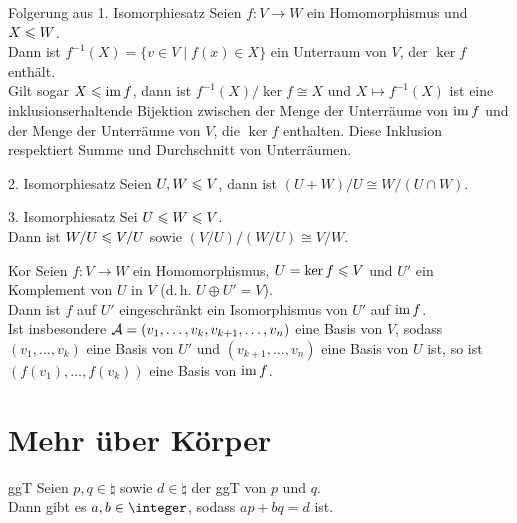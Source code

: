 \begin{Satz}{Folgerung aus 1. Isomorphiesatz}
    Seien $f: V \rightarrow W$ ein Homomorphismus und $X \leqslant W$. \\
    Dann ist $f^{-1}(X) = \{v \in V \;|\; f(x) \in X\}$ ein Unterraum von
    $V$, der $\ker f$ enthält. \\
    Gilt sogar $X \leqslant \operatorname{im} f$, dann ist $f^{-1}(X) / \ker f \cong X$ und
    $X \mapsto f^{-1}(X)$ ist eine inklusionserhaltende Bijektion zwischen
    der Menge der Unterräume von $\operatorname{im} f$ und der Menge der Unterräume von
    $V$, die $\ker f$ enthalten.
    Diese Inklusion respektiert Summe und Durchschnitt von Unterräumen.
\end{Satz}

\begin{Satz}{2. Isomorphiesatz}
    Seien $U, W \leqslant V$, dann ist
    $(U + W)/U \cong W/(U \cap W)$.
\end{Satz}

\begin{Satz}{3. Isomorphiesatz}
    Sei $U \leqslant W \leqslant V$. \\
    Dann ist $W/U \leqslant V/U$ sowie
    $(V/U)\big/(W/U) \cong V/W$.
\end{Satz}

\begin{Satz}{Kor}
    Seien $f: V \rightarrow W$ ein Homomorphismus, $U = \ker f \leqslant V$
    und $U'$ ein Komplement von $U$ in $V$ (d.\,h. $U \oplus U' = V$). \\
    Dann ist $f$ auf $U'$ eingeschränkt ein Isomorphismus von $U'$ auf
    $\operatorname{im} f$. \\
    Ist insbesondere $\mathcal{A} = (v_1, \ldots, v_k, v_{k+1}, \ldots, v_n)$
    eine Basis von $V$, sodass $(v_1, \ldots, v_k)$ eine Basis von $U'$ und
    $(v_{k+1}, \ldots, v_n)$ eine Basis von $U$ ist, so ist
    $(f(v_1), \ldots, f(v_k))$ eine Basis von $\operatorname{im} f$.
\end{Satz}

\pagebreak

\section{%
    Mehr über Körper%
}

\begin{Lemma}{ggT}
    Seien $p, q \in \natural$ sowie $d \in \natural$ der ggT von $p$ und
    $q$. \\
    Dann gibt es $a, b \in \integer$, sodass $ap + bq = d$ ist.
\end{Lemma}

